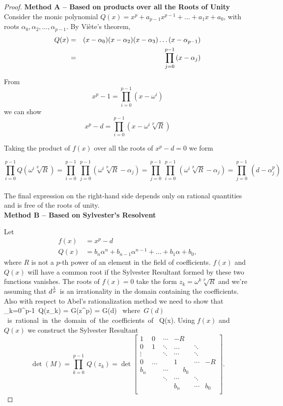 \begin{proof}
{\bf Method A  --  Based on products over all the Roots of Unity} \\

Consider the monic polynomial $Q(x) =  x^p + a_{p-1} x^{p-1} + \hdots + a_1 x + a_0$, with roots $\alpha_0, \alpha_2, \hdots, \alpha_{p-1}$. 
By Vi\`ete's theorem,
\begin{eqnarray*}
Q(x) &=&  (x - \alpha_0)(x-\alpha_2)(x-\alpha_3) \hdots (x- \alpha_{p-1}) \cr
&=& \prod_{j= 0}^{p-1}\, (x - \alpha_j) \cr
\end{eqnarray*}
  
From \[x^p - 1 = \prod_{i=0}^{p-1} (x - \omega^i ) \] we can show 
\[ x^p - d = \prod_{i=0}^{p-1} (x - \omega^i \sqrt[p]{R}) \]

Taking the product of $f(x)$ over all the roots  of $x^p - d = 0$  we form

\[ \prod_{i = 0}^{p-1} Q(\omega^i \sqrt[p]{R} ) =  \prod_{i = 0}^{p-1} \  \prod_{j = 0}^{p-1} (\omega^i \sqrt[p]{R} - \alpha_j) =  \prod_{j = 0}^{p-1}  \ \prod_{i = 0}^{p-1}\, (\omega^i \sqrt[p]{R} - \alpha_j)  =  \prod_{j = 0}^{p-1}  \ (d - \alpha_j^p)   \] \\

The final expression on the right-hand side depends only on rational quantities and is free of the roots of unity. \\

{\bf Method B -- Based on Sylvester's Resolvent }

Let 
\begin{align*}
f(x)  &= x^{p} - d\\
Q(x) &= b_{n} \alpha^{n} + b_{n-1}\alpha^{n-1} + \dots + b_1 \alpha    + b_0  , 
\end{align*} 
where $R$ is not a $p$-th power of an element in the field of coefficients. 
$f(x)$ and $Q(x)$ will have a common root if the Sylvester Resultant formed by these two functions vanishes. 
The roots of $f(x) = 0$ take the form $z_k = \omega^k \sqrt[p]{R}$ and we're assuming that $d^{1\over p}$ is an irrationality in the domain containing the coefficients. 
Also with respect to Abel's rationalization method 
we need to show that 
\be \prod_{k=0}^{p-1}\, Q(z_k) = G(z^p)  = G(d)  \mbox{  where $G(d)$ is rational in the domain of the coefficients of  }  Q(x).\ee
Using $f(x)$ and $Q(x)$ we construct the Sylvester Resultant
\[\det(M) = \prod_{k=0}^{p-1}\, Q(z_k)  =
\det \begin{bmatrix}
1     & 0 & \cdots  & -R                   &            &    \\
 0    &  1 & \ddots & \dots               & \ddots  &    \\
 \vdots  &  & \ddots & \cdots               & \ddots  &    \\
 0      &  \hdots   &            & 1                       & \cdots  & -R\\
b_{n} &     & \cdots & ~~~~~~b_0 &             & \\
       &     & \ddots & \cdots                & \ddots & \\
       &     &            &b_{n}                     & \cdots &b_0 \\
\end{bmatrix}.\]


\end{proof}
